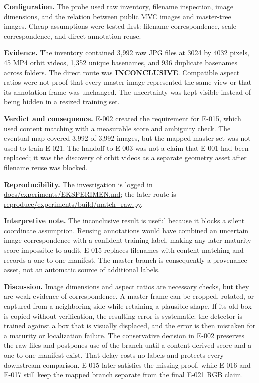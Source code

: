 \documentclass[preprint,12pt]{elsarticle}
\newcommand{\pathcode}[1]{\scriptsize\url{#1}}
\begin{document}
\textbf{Configuration.} The probe used raw inventory, filename inspection,
image dimensions, and the relation between public MVC images and master-tree
images. Cheap assumptions were tested first: filename correspondence, scale
correspondence, and direct annotation reuse.

\textbf{Evidence.} The inventory contained 3,992 raw JPG files at 3024 by
4032 pixels, 45 MP4 orbit videos, 1,352 unique basenames, and 936 duplicate
basenames across folders. The direct route was \textbf{INCONCLUSIVE}. Compatible
aspect ratios were not proof that every master image represented the same view
or that its annotation frame was unchanged. The uncertainty was kept visible
instead of being hidden in a resized training set.

\textbf{Verdict and consequence.} E-002 created the requirement for E-015,
which used content matching with a measurable score and ambiguity check. The
eventual map covered 3,992 of 3,992 images, but the mapped master set was not
used to train E-021. The handoff to E-003 was not a claim that E-001 had been
replaced; it was the discovery of orbit videos as a separate geometry asset
after filename reuse was blocked.

\textbf{Reproducibility.} The investigation is logged in
\pathcode{docs/experiments/EKSPERIMEN.md}; the later route is
\pathcode{reproduce/experiments/build/match_raw.py}.

\textbf{Interpretive note.} The inconclusive result is useful because it
blocks a silent coordinate assumption. Reusing annotations would have
combined an uncertain image correspondence with a confident training label,
making any later maturity score impossible to audit. E-015 replaces
filenames with content matching and records a one-to-one manifest. The
master branch is consequently a provenance asset, not an automatic source of
additional labels.

\textbf{Discussion.} Image dimensions and aspect ratios are necessary checks,
but they are weak evidence of correspondence. A master frame can be cropped,
rotated, or captured from a neighboring side while retaining a plausible
shape. If its old box is copied without verification, the resulting error is
systematic: the detector is trained against a box that is visually displaced,
and the error is then mistaken for a maturity or localization failure. The
conservative decision in E-002 preserves the raw files and postpones use of
the branch until a content-derived score and a one-to-one manifest exist.
That delay costs no labels and protects every downstream comparison. E-015
later satisfies the missing proof, while E-016 and E-017 still keep the
mapped branch separate from the final E-021 RGB claim.
\end{document}
